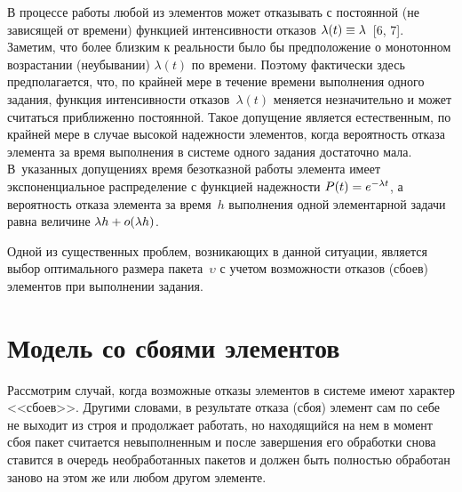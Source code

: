 \begin{multicols}{2}
     В процессе работы любой из элементов может отказывать с постоянной 
(не зависящей от времени) функцией интенсивности отказов 
$\lambda(t)\hm\equiv \lambda$~[6, 7]. Заметим, что более близким к 
реальности было бы предположение о монотонном возрастании 
(неубывании) $\lambda(t)$ по времени. Поэтому фактически здесь 
предполагается, что, по крайней мере в течение времени выполнения одного 
задания, функция интенсивности отказов~$\lambda(t)$ меняется 
незначительно и может считаться приближенно постоянной. Такое 
допущение является естественным, по крайней мере в случае высокой 
надежности элементов, когда вероятность отказа элемента за время 
выполнения в системе одного задания достаточно мала. В~указанных 
допущениях время безотказной работы элемента имеет экспоненциальное 
распределение с функцией надежности $P(t)\hm=e^{-\lambda t}$, а вероятность 
отказа элемента за время~$h$ выполнения одной элементарной задачи равна 
величине $\lambda h\hm+ o(\lambda h)$.
     
     Одной из существенных проблем, возникающих в данной ситуации, 
является выбор оптимального размера пакета~$\upsilon$ с учетом 
возможности отказов (сбоев) элементов при выполнении задания.

\section{Модель со сбоями элементов}

     Рассмотрим случай, когда возможные отказы элементов в системе 
имеют характер <<сбоев>>. Другими словами, в результате отказа (сбоя) 
элемент сам по себе не выходит из строя и продолжает работать, но 
находящийся на нем в момент сбоя пакет считается невыполненным и после 
завершения его обработки снова ставится в очередь необработанных пакетов 
и должен быть полностью обработан заново на этом же или любом другом 
элементе.
     

\end{multicols}

